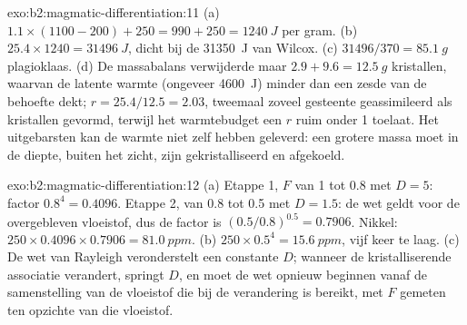 \begin{solution}{exo:b2:magmatic-differentiation:11}
(a) $1.1\times(1100 - 200) + 250 = 990 + 250 = \qty{1240}{J}$ per gram. (b)
$25.4\times1240 = \qty{31496}{J}$, dicht bij de \qty{31350}{J} van Wilcox. (c)
$31496/370 = \qty{85.1}{g}$ plagioklaas. (d) De massabalans verwijderde maar $2.9 +
9.6 = \qty{12.5}{g}$ kristallen, waarvan de latente warmte (ongeveer \qty{4600}{J}) minder
dan een zesde van de behoefte dekt; $r = 25.4/12.5 = 2.03$, tweemaal zoveel gesteente geassimileerd als
kristallen gevormd, terwijl het warmtebudget een $r$ ruim onder 1 toelaat. Het uitgebarsten 
kan de warmte niet zelf hebben geleverd: een grotere massa  moet in de diepte,
buiten het zicht, zijn gekristalliseerd en afgekoeld.
\end{solution}

\begin{solution}{exo:b2:magmatic-differentiation:12}
(a) Etappe 1, $F$ van 1 tot 0.8 met $D = 5$: factor $0.8^{4} = 0.4096$. Etappe 2,
van 0.8 tot 0.5 met $D = 1.5$: de wet geldt voor de overgebleven vloeistof, dus de
factor is $(0.5/0.8)^{0.5} = 0.7906$. Nikkel: $250\times0.4096\times0.7906 =
\qty{81.0}{ppm}$. (b) $250\times0.5^{4} = \qty{15.6}{ppm}$, vijf keer te laag. (c)
De wet van Rayleigh veronderstelt een constante $D$; wanneer de kristalliserende associatie verandert,
springt $D$, en moet de wet opnieuw beginnen vanaf de samenstelling van de vloeistof die bij de
verandering is bereikt, met $F$ gemeten ten opzichte van die vloeistof.
\end{solution}

